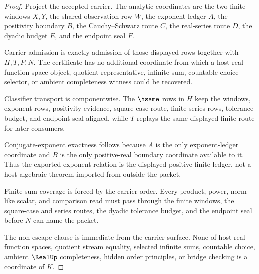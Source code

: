\begin{proof}
Project the accepted carrier. The analytic coordinates are the two finite windows $X,Y$, the shared observation row $W$, the exponent ledger $A$, the positivity boundary $B$, the Cauchy--Schwarz route $C$, the real-series route $D$, the dyadic budget $E$, and the endpoint seal $F$.

Carrier admission is exactly admission of those displayed rows together with $H,T,P,N$. The certificate has no additional coordinate from which a host real function-space object, quotient representative, infinite sum, countable-choice selector, or ambient completeness witness could be recovered.

Classifier transport is componentwise. The $\hsame$ rows in $H$ keep the windows, exponent rows, positivity evidence, square-case route, finite-series rows, tolerance budget, and endpoint seal aligned, while $T$ replays the same displayed finite route for later consumers.

Conjugate-exponent exactness follows because $A$ is the only exponent-ledger coordinate and $B$ is the only positive-real boundary coordinate available to it. Thus the exported exponent relation is the displayed positive finite ledger, not a host algebraic theorem imported from outside the packet.

Finite-sum coverage is forced by the carrier order. Every product, power, norm-like scalar, and comparison read must pass through the finite windows, the square-case and series routes, the dyadic tolerance budget, and the endpoint seal before $N$ can name the packet.

The non-escape clause is immediate from the carrier surface. None of host real function spaces, quotient stream equality, selected infinite sums, countable choice, ambient $\RealUp$ completeness, hidden order principles, or bridge checking is a coordinate of $K$.
\end{proof}

